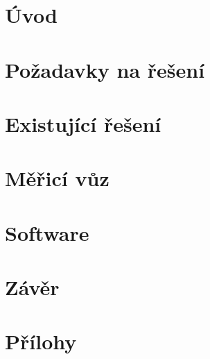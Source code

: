 \documentclass[digital, oneside, table, nolot, nolof]{fithesis3}
\begin{document}

\setlength{\parindent}{0cm}
\setlength{\parskip}{3mm plus2pt minus2pt}
\renewenvironment{compactenum}
	{\begin{enumerate}[leftmargin=8mm,itemsep=0pt,parsep=1pt,topsep=1pt,partopsep=1pt]}
	{\end{enumerate}}
\renewenvironment{compactitem}
	{\begin{itemize}[leftmargin=8mm,itemsep=0pt,parsep=0pt,topsep=1pt,partopsep=1pt]}
	{\end{itemize}}



\chapter{Úvod} \label{chap:uvod}


\chapter{Požadavky na řešení} \label{chap:pozadavky}


\chapter{Existující řešení} \label{chap:prehled}


\chapter{Měřicí vůz} \label{chap:merici-vuz}


\chapter{Software} \label{chap:sw}


\chapter{Závěr} \label{chap:zaver}


\printbibliography[heading=bibintoc]

\appendix
\chapter{Přílohy} \label{chap:appendix}

\end{document}
